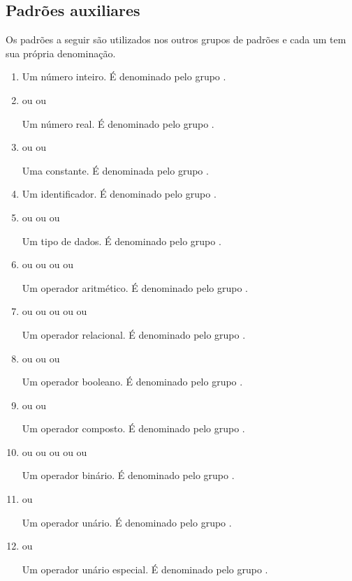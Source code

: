 \documentclass{llncs}
\begin{document}
\subsection{Padrões auxiliares}
Os padrões a seguir são utilizados nos outros grupos de padrões e cada um tem sua própria denominação.

\begin{enumerate}
	\item {}

		Um número inteiro. É denominado pelo grupo .
	\item
		 ou
		 ou

		Um número real. É denominado pelo grupo .
	\item {} ou  ou 

		Uma constante. É denominada pelo grupo .
	\item \pat{[[a-zA-Z\_]][[a-zA-Z0-9\_]]^{\star}}

		Um identificador. É denominado pelo grupo .
	\item {} ou  ou  ou 

		Um tipo de dados. É denominado pelo grupo .
	\item \pat{*} ou \pat{/} ou \pat{\%} ou \pat{+} ou \pat{-}

		Um operador aritmético. É denominado pelo grupo .
	\item \pat{<} ou \pat{>} ou \pat{<=} ou \pat{>=} ou \pat{==} ou \pat{!=}

		Um operador relacional. É denominado pelo grupo .
	\item \pat{\&\&} ou \pat{||} ou \pat{\&} ou \pat{|}

		Um operador booleano. É denominado pelo grupo .
	\item {} ou \pat{\&=} ou \pat{|=}

		Um operador composto. É denominado pelo grupo .
	\item {} ou  ou  ou  ou \pat{=} ou 

		Um operador binário. É denominado pelo grupo .
	\item \pat{!} ou \pat{-}

		Um operador unário. É denominado pelo grupo .
	\item \pat{++} ou \pat{- -}

		Um operador unário especial. É denominado pelo grupo .
\end{enumerate}
\end{document}
